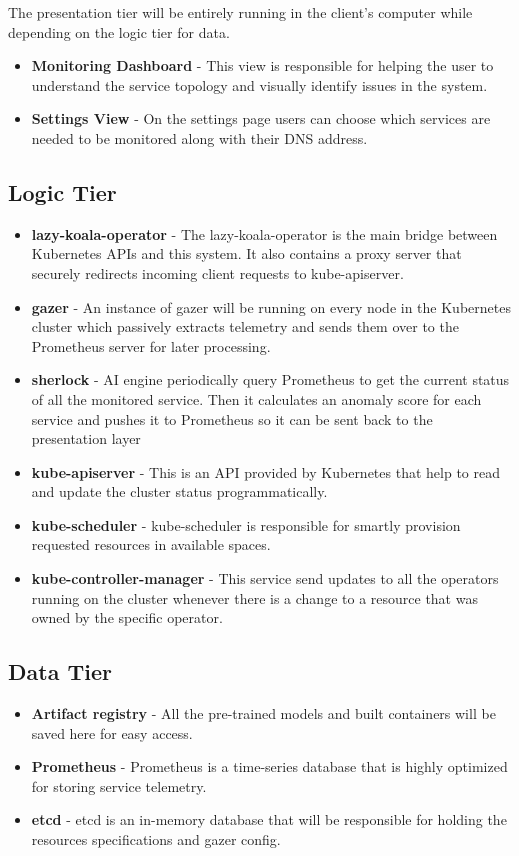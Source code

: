 The presentation tier will be entirely running in the client's computer while depending on the logic tier for data.

\begin{itemize}
    \item \textbf{Monitoring Dashboard} - This view is responsible for helping the user to understand the service topology and visually identify issues in the system.
    \item \textbf{Settings View} - On the settings page users can choose which services are needed to be monitored along with their DNS address.
\end{itemize}

\subsection{Logic Tier}

\begin{itemize}
    \item \textbf{\ac{lazy-koala-operator}} - The \ac{lazy-koala-operator} is the main bridge between Kubernetes APIs and this system. It also contains a proxy server that securely redirects incoming client requests to kube-apiserver.
    \item \textbf{\ac{gazer}} - An instance of \ac{gazer} will be running on every node in the Kubernetes cluster which passively extracts telemetry and sends them over to the Prometheus server for later processing.
    \item \textbf{\ac{sherlock}} - AI engine periodically query Prometheus to get the current status of all the monitored service. Then it calculates an anomaly score for each service and pushes it to Prometheus so it can be sent back to the presentation layer
    \item \textbf{kube-apiserver} - This is an API provided by Kubernetes that help to read and update the cluster status programmatically.
    \item \textbf{kube-scheduler} - kube-scheduler is responsible for smartly provision requested resources in available spaces.
    \item \textbf{kube-controller-manager} - This service send updates to all the operators running on the cluster whenever there is a change to a resource that was owned by the specific operator.
\end{itemize}

\subsection{Data Tier}

\begin{itemize}
    \item \textbf{Artifact registry} - All the pre-trained models and built containers will be saved here for easy access.
    \item \textbf{Prometheus} - Prometheus is a time-series database that is highly optimized for storing service telemetry.
    \item \textbf{etcd} - etcd is an in-memory database that will be responsible for holding the resources specifications and \ac{gazer} config.
\end{itemize}
